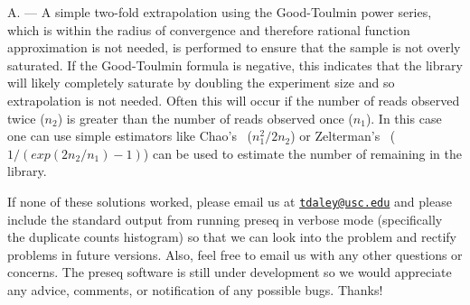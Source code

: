 \documentclass[11pt, titlepage]{article}
\newcounter{question}
\newcommand\Ans[1]{%
    \leavevmode\par\noindent
   {\leftskip37pt
    A. --- #1 \par }}
\begin{document}
\Ans{
A simple two-fold extrapolation using the Good-Toulmin
power series, which is within the radius of convergence and
therefore rational function approximation is not needed,
is performed to ensure that the sample is not overly saturated.
If the Good-Toulmin formula is negative, this indicates that the
library will likely completely saturate by doubling the experiment
size and so extrapolation is not needed.  Often this will occur
if the number of reads observed twice ($n_{2}$) is greater than the number 
of reads observed once ($n_{1}$).  In this case one can use 
simple estimators like Chao's~\cite{chao1987estimating} ($n_{1}^2 / 2 n_{2}$)
or Zelterman's~\cite{zelterman1988robust} 
($1 / (exp(2 n_{2}/ n_{1}) - 1)$) can be used to estimate
the number of remaining in the library.
}

\vspace{5mm}
If none of these solutions worked, please email us at 
\href{mailto:tdaley@usc.edu}{\nolinkurl{tdaley@usc.edu}}
and please include the standard output from running preseq in
verbose mode (specifically the duplicate counts histogram) so 
that we can look into the problem and rectify problems in future
versions.  Also, feel free to email us with any other questions or
concerns.
The preseq software is still under development so we would appreciate any 
advice, comments, or notification of any possible bugs. Thanks!

\newpage



\end{document}
